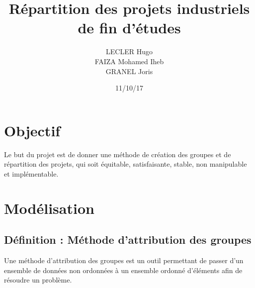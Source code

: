 \documentclass{article}
\title{Répartition des projets industriels de fin d'études}
\author{LECLER Hugo \\ FAIZA Mohamed Iheb \\ GRANEL Joris}
\date{11/10/17}
\begin{document}
\maketitle

\section{Objectif}
Le but du projet est de donner une méthode de création des groupes et de répartition des projets, qui soit équitable, satisfaisante, stable, non manipulable et implémentable.

\section{Modélisation}

\subsection{Définition : Méthode d'attribution des groupes}
Une méthode d'attribution des groupes est un outil permettant de passer d'un ensemble de données non ordonnées à un ensemble ordonné d'éléments afin de résoudre un problème.
\end{document}
